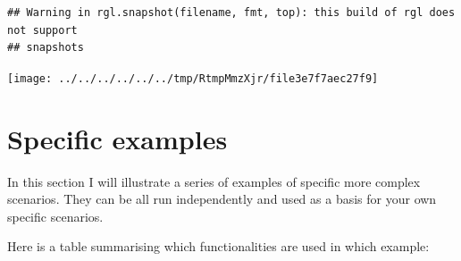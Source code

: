 \documentclass[
]{book}
\begin{document}
\begin{verbatim}
## Warning in rgl.snapshot(filename, fmt, top): this build of rgl does not support
## snapshots
\end{verbatim}

\texttt{[image: ../../../../../../tmp/RtmpMmzXjr/file3e7f7aec27f9]}

\hypertarget{specific-examples}{%
\chapter{Specific examples}\label{specific-examples}}

In this section I will illustrate a series of examples of specific more complex scenarios.
They can be all run independently and used as a basis for your own specific scenarios.

Here is a table summarising which functionalities are used in which example:
\end{document}

